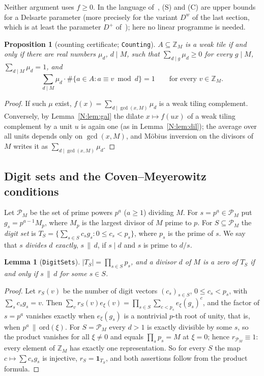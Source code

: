 \documentclass[11pt,a4paper]{amsart}
\newtheorem{proposition}[theorem]{Proposition}
\newtheorem{lemma}[theorem]{Lemma}
\theoremstyle{definition}
\theoremstyle{remark}
\newcommand{\Z}{\mathbb{Z}}
\newcommand{\one}{\mathbf{1}}
\newcommand{\lean}[1]{\texttt{#1}}
\begin{document}
Neither argument uses $\hat f\ge 0$. In the language of~\cite{KLMS}, (S) and (C) are upper bounds for a Delsarte
parameter (more precisely for the variant $D^w$ of the last section, which is at least the parameter $D^+$
of~\cite{KLMS}); here no linear programme is needed.

\begin{proposition}[counting certificate; \lean{Counting}]\label{N:prop:cert}
$A\subseteq\Z_M$ is a weak tile if and only if there are real numbers $\mu_d$, $d\mid M$, such that
$\sum_{d\mid g}\mu_d\ge0$ for every $g\mid M$, $\sum_{d\mid M}\mu_d=1$, and
\[
 \sum_{d\mid M}\mu_d\cdot\#\{a\in A: a\equiv v \bmod d\}=1\qquad\text{for every } v\in\Z_M .
\]
\end{proposition}
\begin{proof}
If such $\mu$ exist, $f(x)=\sum_{d\mid\gcd(x,M)}\mu_d$ is a weak tiling complement. Conversely, by
Lemma~\ref{N:lem:gal} the dilate $x\mapsto f(ux)$ of a weak tiling complement by a unit $u$ is again one (as in
Lemma~\ref{N:lem:dil}); the average over all units depends only on $\gcd(x,M)$, and M\"obius inversion on the
divisors of $M$ writes it as $\sum_{d\mid\gcd(x,M)}\mu_d$.
\end{proof}

\subsection*{Digit sets and the Coven--Meyerowitz conditions}
Let $\mathcal P_M$ be the set of prime powers $p^a$ ($a\ge1$) dividing $M$. For $s=p^a\in\mathcal P_M$ put
$g_s=p^{a-1}M_p$, where $M_p$ is the largest divisor of $M$ prime to $p$. For $S\subseteq\mathcal P_M$ the
\emph{digit set} is $T_S=\{\sum_{s\in S}c_sg_s : 0\le c_s<p_s\}$, where $p_s$ is the prime of $s$. We say that
$s$ \emph{divides $d$ exactly}, $s\,\|\,d$, if $s\mid d$ and $s$ is prime to $d/s$.

\begin{lemma}[\lean{DigitSets}]\label{N:lem:digit}
$|T_S|=\prod_{s\in S}p_s$, and a divisor $d$ of $M$ is a zero of $T_S$ if and only if $s\,\|\,d$ for some $s\in S$.
\end{lemma}
\begin{proof}
Let $r_S(v)$ be the number of digit vectors $(c_s)_{s\in S}$, $0\le c_s<p_s$, with $\sum_sc_sg_s=v$. Then
$\sum_vr_S(v)e_\xi(v)=\prod_{s\in S}\sum_{c<p_s}e_\xi(g_s)^{c}$, and the factor of $s=p^a$ vanishes exactly when
$e_\xi(g_s)$ is a nontrivial $p$-th root of unity, that is, when $p^a\,\|\,\mathrm{ord}(\xi)$. For
$S=\mathcal P_M$ every $d>1$ is exactly divisible by some $s$, so the product vanishes for all $\xi\ne 0$ and
equals $\prod_sp_s=M$ at $\xi=0$; hence $r_{\mathcal P_M}\equiv 1$: every element of $\Z_M$ has exactly one
representation. So for every $S$ the map $c\mapsto\sum c_sg_s$ is injective, $r_S=\one_{T_S}$, and both
assertions follow from the product formula.
\end{proof}
\end{document}
